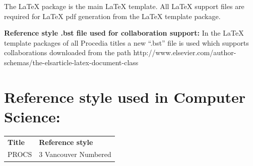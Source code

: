 \documentclass[3p,times,procedia]{elsarticle}
\begin{document}
The LaTeX package is the main LaTeX template. All LaTeX support files are required for LaTeX pdf generation from the LaTeX template package. 

{\bf Reference style .bst file used for collaboration support:} In the LaTeX template packages of all Procedia titles a new ``.bst'' file is used which supports collaborations downloaded from the path http://www.elsevier.com/author-schemas/the-elsarticle-latex-document-class

\section{Reference style used in Computer Science:}
\let\footnotesize\normalsize
\hspace*{-10pt}\begin{tabular*}{\hsize}{@{}ll@{}}
{\bf Title}&{\bf Reference style} \\[6pt]
PROCS  & 3 Vancouver Numbered
\end{tabular*}
\end{document}
